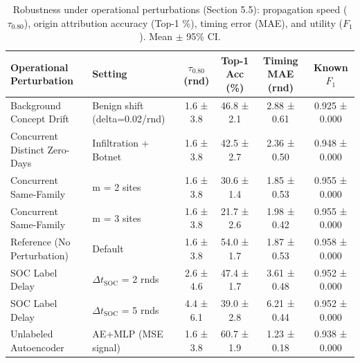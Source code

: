 \begin{table}[t]
\centering
\small
\caption{Robustness under operational perturbations (Section 5.5): propagation speed ($\tau_{0.80}$), origin attribution accuracy (Top-1 \%), timing error (MAE), and utility ($F_1$). Mean $\pm$ 95\% CI.}
\label{tab:robustness}
\begin{tabular}{llcccc}
\toprule
Operational Perturbation & Setting & $\tau_{0.80}$ (rnd) & Top-1 Acc (\%) & Timing MAE (rnd) & Known $F_1$ \\
\midrule
Background Concept Drift & Benign shift (delta=0.02/rnd) & 1.6 ± 3.8 & 46.8 ± 2.1 & 2.88 ± 0.61 & 0.925 ± 0.000 \\
Concurrent Distinct Zero-Days & Infiltration + Botnet & 1.6 ± 3.8 & 42.5 ± 2.7 & 2.36 ± 0.50 & 0.948 ± 0.000 \\
Concurrent Same-Family & m = 2 sites & 1.6 ± 3.8 & 30.6 ± 1.4 & 1.85 ± 0.53 & 0.955 ± 0.000 \\
Concurrent Same-Family & m = 3 sites & 1.6 ± 3.8 & 21.7 ± 2.6 & 1.98 ± 0.42 & 0.955 ± 0.000 \\
Reference (No Perturbation) & Default & 1.6 ± 3.8 & 54.0 ± 1.7 & 1.87 ± 0.53 & 0.958 ± 0.000 \\
SOC Label Delay & $\Delta t_{\text{SOC}}$ = 2 rnds & 2.6 ± 4.6 & 47.4 ± 1.7 & 3.61 ± 0.48 & 0.952 ± 0.000 \\
SOC Label Delay & $\Delta t_{\text{SOC}}$ = 5 rnds & 4.4 ± 6.1 & 39.0 ± 2.8 & 6.21 ± 0.44 & 0.952 ± 0.000 \\
Unlabeled Autoencoder & AE+MLP (MSE signal) & 1.6 ± 3.8 & 60.7 ± 1.9 & 1.23 ± 0.18 & 0.938 ± 0.000 \\
\bottomrule
\end{tabular}
\end{table}
